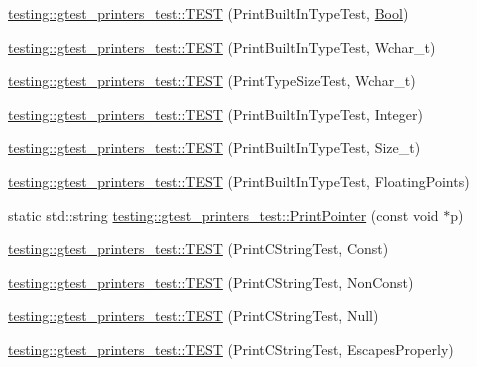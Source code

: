 \begin{DoxyCompactItemize}
\item 
\mbox{\hyperlink{namespacetesting_1_1gtest__printers__test_a6f08c464dc0b8eb822368f552d4467ad}{testing\+::gtest\+\_\+printers\+\_\+test\+::\+T\+E\+ST}} (Print\+Built\+In\+Type\+Test, \mbox{\hyperlink{structBool}{Bool}})
\item 
\mbox{\hyperlink{namespacetesting_1_1gtest__printers__test_ab567ebd97eff0a4b9a20a5f5cb77d678}{testing\+::gtest\+\_\+printers\+\_\+test\+::\+T\+E\+ST}} (Print\+Built\+In\+Type\+Test, Wchar\+\_\+t)
\item 
\mbox{\hyperlink{namespacetesting_1_1gtest__printers__test_a705ec4c2886606a22194107397fceea6}{testing\+::gtest\+\_\+printers\+\_\+test\+::\+T\+E\+ST}} (Print\+Type\+Size\+Test, Wchar\+\_\+t)
\item 
\mbox{\hyperlink{namespacetesting_1_1gtest__printers__test_a278d53e99390c7b31ff531524fe5e86e}{testing\+::gtest\+\_\+printers\+\_\+test\+::\+T\+E\+ST}} (Print\+Built\+In\+Type\+Test, Integer)
\item 
\mbox{\hyperlink{namespacetesting_1_1gtest__printers__test_a991dc124d153742c3ca126b2fa9ccab5}{testing\+::gtest\+\_\+printers\+\_\+test\+::\+T\+E\+ST}} (Print\+Built\+In\+Type\+Test, Size\+\_\+t)
\item 
\mbox{\hyperlink{namespacetesting_1_1gtest__printers__test_acde0b28d177604ddb5e185d7b107f6f7}{testing\+::gtest\+\_\+printers\+\_\+test\+::\+T\+E\+ST}} (Print\+Built\+In\+Type\+Test, Floating\+Points)
\item 
static std\+::string \mbox{\hyperlink{namespacetesting_1_1gtest__printers__test_ac1a9747bc3353294dd18c295a03915e2}{testing\+::gtest\+\_\+printers\+\_\+test\+::\+Print\+Pointer}} (const void $\ast$p)
\item 
\mbox{\hyperlink{namespacetesting_1_1gtest__printers__test_a6cd47b21ad8d9ac66ba57b5b6415a924}{testing\+::gtest\+\_\+printers\+\_\+test\+::\+T\+E\+ST}} (Print\+C\+String\+Test, Const)
\item 
\mbox{\hyperlink{namespacetesting_1_1gtest__printers__test_a89d9905fecee1b976c26d35498734dd4}{testing\+::gtest\+\_\+printers\+\_\+test\+::\+T\+E\+ST}} (Print\+C\+String\+Test, Non\+Const)
\item 
\mbox{\hyperlink{namespacetesting_1_1gtest__printers__test_ad29b97d58a4d1e5e8dd4d854f66b9e22}{testing\+::gtest\+\_\+printers\+\_\+test\+::\+T\+E\+ST}} (Print\+C\+String\+Test, Null)
\item 
\mbox{\hyperlink{namespacetesting_1_1gtest__printers__test_a140030b990011abab91d4c0b59f21edd}{testing\+::gtest\+\_\+printers\+\_\+test\+::\+T\+E\+ST}} (Print\+C\+String\+Test, Escapes\+Properly)

\end{DoxyCompactItemize}
